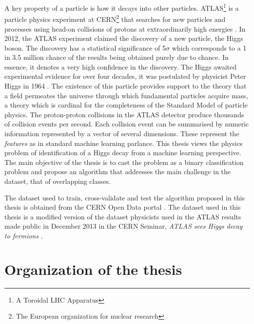 
A key property of a particle is how it decays into other particles. \gls{ATLAS}\footnote{A Toroidal LHC Apparatus} is a particle physics experiment at \gls{CERN}\footnote{The European organization for nuclear research} that searches for new particles and processes using head-on collisions of protons at extraordinarily high energies \cite{open}. In 2012, the ATLAS experiment claimed the discovery of a new particle, the Higgs boson. The discovery has a statistical significance of 5$\sigma$ which corresponds to a 1 in 3.5 million chance of the results being obtained purely due to chance. In essence, it denotes a very high confidence in the discovery. The Higgs awaited experimental evidence for over four decades, it was postulated by physicist Peter Higgs in 1964 \cite{higgs}. The existence of this particle provides support to the theory that a field permeates the universe through which fundamental particles acquire mass, a theory which is cardinal for the completeness of the Standard Model of particle physics. The proton-proton collisions in the ATLAS detector produce thousands of collision events per second. Each collision event can be summarised by numeric information represented by a vector of several dimensions. These represent the \textit{features} as in standard machine learning parlance. This thesis views the physics problem of identification of a Higgs decay from a machine learning perspective. The main objective of the thesis is to cast the problem as a binary classification problem and propose an algorithm that addresses the main challenge in the dataset, that of overlapping classes. 

The dataset used to train, cross-validate and test the algorithm proposed in this thesis is obtained from the CERN Open Data portal \cite{data}. The dataset used in this thesis is a modified version of the dataset physicists used in the ATLAS results made public in December 2013 in the CERN Seminar, \textit{ATLAS sees Higgs decay to fermions} \cite{fermions}.

\section{Organization of the thesis}

